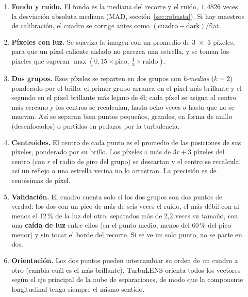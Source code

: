 \begin{enumerate}
\item \textbf{Fondo y ruido.} El fondo es la mediana del recorte y el ruido, $1{,}4826$ veces la desviación absoluta
mediana (MAD, sección~\ref{sec:robusta}). Si hay maestros de calibración, el cuadro se corrige antes como
$(\text{cuadro} - \text{dark})/\text{flat}$.
\item \textbf{Píxeles con luz.} Se suaviza la imagen con un promedio de 3~×~3 píxeles, para que un píxel caliente aislado
no parezca una estrella, y se toman los píxeles que superan
$\max(0{,}15\times\text{pico},\ \tfrac43\times\text{ruido})$.
\item \textbf{Dos grupos.} Esos píxeles se reparten en dos grupos con \emph{k-medias} ($k = 2$) ponderado por el
brillo: el primer grupo arranca en el píxel más brillante y el segundo en el píxel brillante más lejano de él; cada píxel
se asigna al centro más cercano y los centros se recalculan, hasta ocho veces o hasta que no se muevan. Así se separan bien
puntos pequeños, grandes, en forma de anillo (desenfocados) o partidos en pedazos por la turbulencia.
\item \textbf{Centroides.} El centro de cada punto es el promedio de las posiciones de sus píxeles, ponderado por su
brillo. Los píxeles a más de $3r + 3$ píxeles del centro (con $r$ el radio de giro del grupo) se descartan y el centro se
recalcula: así un reflejo o una estrella vecina no lo arrastran. La precisión es de centésimas de píxel.
\item \textbf{Validación.} El cuadro cuenta solo si los dos grupos son dos puntos de verdad: los dos con un pico de más de
seis veces el ruido, el más débil con al menos el 12\,\% de la luz del otro, separados más de 2,2 veces su tamaño, con una
\textbf{caída de luz} entre ellos (en el punto medio, menos del 60\,\% del pico menor) y sin tocar el borde del recorte.
Si se ve un solo punto, no se parte en dos.
\item \textbf{Orientación.} Los dos puntos pueden intercambiar su orden de un cuadro a otro (cambia cuál es el más
brillante). TurbuLENS orienta todos los vectores según el eje principal de la nube de separaciones, de modo que la
componente longitudinal tenga siempre el mismo sentido.
\end{enumerate}

